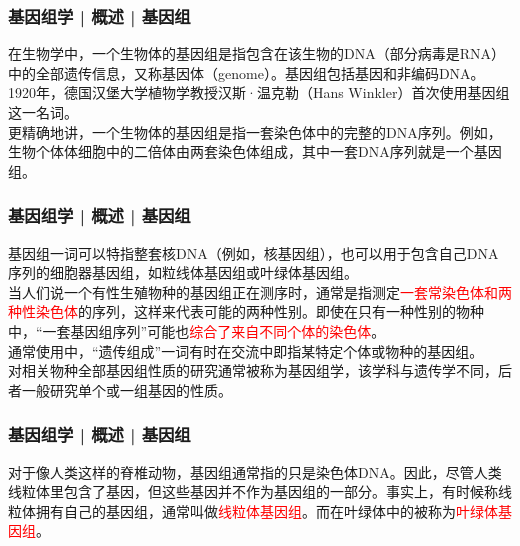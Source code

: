 \begin{frame}
  \frametitle{基因组学 | 概述 | 基因组}
在生物学中，一个生物体的基因组是指包含在该生物的DNA（部分病毒是RNA）中的全部遗传信息，又称基因体（genome）。基因组包括基因和非编码DNA。\\
\vspace{1em}
1920年，德国汉堡大学植物学教授汉斯·温克勒（Hans Winkler）首次使用基因组这一名词。\\
\vspace{1em}
更精确地讲，一个生物体的基因组是指一套染色体中的完整的DNA序列。例如，生物个体体细胞中的二倍体由两套染色体组成，其中一套DNA序列就是一个基因组。
\end{frame}

\begin{frame}
  \frametitle{基因组学 | 概述 | 基因组}
\vspace{1em}
基因组一词可以特指整套核DNA（例如，核基因组），也可以用于包含自己DNA序列的细胞器基因组，如粒线体基因组或叶绿体基因组。\\
\vspace{1em}
当人们说一个有性生殖物种的基因组正在测序时，通常是指测定\textcolor{red}{一套常染色体和两种性染色体}的序列，这样来代表可能的两种性别。即使在只有一种性别的物种中，“一套基因组序列”可能也\textcolor{red}{综合了来自不同个体的染色体}。\\
\vspace{1em}
通常使用中，“遗传组成”一词有时在交流中即指某特定个体或物种的基因组。\\
\vspace{1em}
对相关物种全部基因组性质的研究通常被称为基因组学，该学科与遗传学不同，后者一般研究单个或一组基因的性质。
\end{frame}


\begin{frame}
  \frametitle{基因组学 | 概述 | 基因组}
对于像人类这样的脊椎动物，基因组通常指的只是染色体DNA。因此，尽管人类线粒体里包含了基因，但这些基因并不作为基因组的一部分。事实上，有时候称线粒体拥有自己的基因组，通常叫做\textcolor{red}{线粒体基因组}。而在叶绿体中的被称为\textcolor{red}{叶绿体基因组}。
\end{frame}

